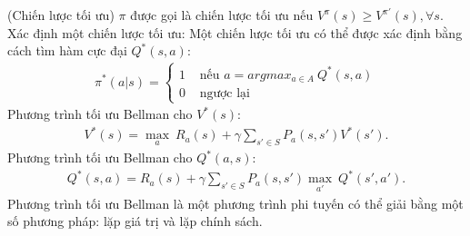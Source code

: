 \begin{dn}\rm 
(Chiến lược tối ưu) $\pi$ được gọi là chiến lược tối ưu nếu $V^{\pi}(s) \geq V^{\pi '}(s), \forall s.$\\
Xác định một chiến lược tối ưu: Một chiến lược tối ưu có thể được xác định bằng cách tìm hàm cực đại $Q^{*}(s,a)$:
\begin{align}
\pi^{*}(a|s)=\begin{cases}
1 & \text{ nếu } a=argmax_{a\in A}~Q^{*}(s,a) \\ 
0 & \text{ ngược lại } 
\end{cases}
\end{align}
Phương trình tối ưu Bellman cho $V^{*}(s)$:
\begin{align}
V^{*}(s)= \displaystyle\max_{a}~ R_{a}(s)+\gamma \sum_{s'\in S}P_{a}(s,s')V^{*}(s').
\end{align}
Phương trình tối ưu Bellman cho $Q^{*}(a,s)$:
\begin{align}
Q^{*}(s,a)=R_{a}(s)+\gamma \sum_{s'\in S}P_{a}(s,s') \displaystyle\max_{a'}~Q^{*}(s',a').
\end{align}
Phương trình tối ưu Bellman là một phương trình phi tuyến có thể giải bằng một số phương pháp: lặp giá trị và lặp chính sách.
\end{dn}